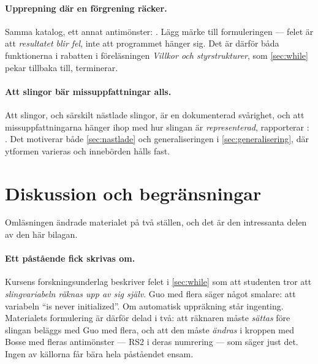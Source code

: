 \paragraph{Upprepning där en förgrening räcker.}  Samma katalog, ett annat
antimönster: .  Lägg märke till
formuleringen --- felet är att \emph{resultatet blir fel}, inte att
programmet hänger sig.  Det är därför båda funktionerna i rabatten i
föreläsningen \emph{Villkor och styrstrukturer}, som \cref{sec:while}
pekar tillbaka till, terminerar.

\paragraph{Att slingor bär missuppfattningar alls.}  Att slingor, och
särskilt nästlade slingor, är en dokumenterad svårighet, och att
missuppfattningarna hänger ihop med hur slingan är \emph{representerad},
rapporterar \textcite{Eckert2022Loops}:
.  Det motiverar både
\cref{sec:nastlade} och generaliseringen i \cref{sec:generalisering}, där
ytformen varieras och innebörden hålls fast.

\section{Diskussion och begränsningar}
\label{sec:miss-diskussion}

Omläsningen ändrade materialet på två ställen, och det är den intressanta
delen av den här bilagan.

\paragraph{Ett påstående fick skrivas om.}  Kursens forskningsunderlag
beskriver felet i \cref{sec:while} som att studenten tror att
\emph{slingvariabeln räknas upp av sig själv}.  Guo med flera säger något
smalare: att variabeln \enquote{is never initialized}.  Om automatisk
uppräkning står ingenting.  Materialets formulering är därför delad i två:
att räknaren måste \emph{sättas} före slingan beläggs med Guo med flera, och
att den måste \emph{ändras} i kroppen med Bosse med fleras antimönster ---
RS2 i deras numrering --- som säger just det.  Ingen av källorna får bära
hela påståendet ensam.

